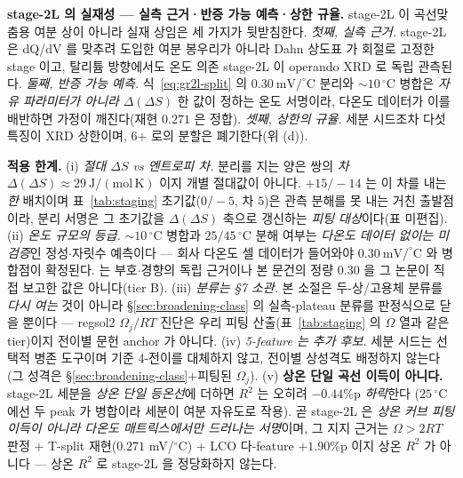 \medskip
\textbf{stage-2L 의 실재성 --- 실측 근거·반증 가능 예측·상한 규율.} stage-2L 이 곡선맞춤용 여분 상이 아니라 실재 상임은 세 가지가 뒷받침한다. \emph{첫째, 실측 근거.}
stage-2L 은 dQ/dV 를 맞추려 도입한 여분 봉우리가 아니라 Dahn 상도표\cite{dahn1991} 가 회절로 고정한 stage
이고, 탈리튬 방향에서도 온도 의존 stage-2L 이 operando XRD 로 독립 관측된다\cite{schmitt2022}. \emph{둘째,
반증 가능 예측.} 식~\eqref{eq:gr2l-split} 의 $0.30\ \mathrm{mV/^\circ C}$ 분리와 $\sim10\,^\circ$C 병합은
\emph{자유 파라미터가 아니라} $\Delta(\Delta S)$ 한 값이 정하는 온도 서명이라, 다온도 데이터가 이를 배반하면
가정이 깨진다(재현 $0.271$ 은 정합). \emph{셋째, 상한의 규율.} 세분 시드조차 다섯 특징이 XRD 상한이며, 6+ 로의
분할은 폐기한다(위 (d)).

\begin{warnbox}
\textbf{적용 한계.} (i) \emph{절대 $\Delta S$ vs 엔트로피 \emph{차}.} 분리를 지는 양은 쌍의 \emph{차}
$\Delta(\Delta S)\approx29\ \mathrm{J/(mol\,K)}$ 이지 개별 절대값이 아니다. $+15/-14$ 는 이 차를 내는 \emph{한}
배치이며 표~\ref{tab:staging} 초기값($0/-5$, 차 $5$)은 관측 분해를 못 내는 거친 출발점이라, 분리 서명은 그
초기값을 $\Delta(\Delta S)$ 축으로 갱신하는 \emph{피팅 대상}이다(표 미편집). (ii) \emph{온도 규모의 등급.}
$\sim10\,^\circ$C 병합과 $25/45\,^\circ$C 분해 여부는 \emph{다온도 데이터 없이는 미검증}인 정성$\cdot$자릿수
예측이다 --- 회사 다온도 셀 데이터가 들어와야 $0.30\ \mathrm{mV/^\circ C}$ 와 병합점이 확정된다.
\cite{schmitt2022} 는 부호$\cdot$경향의 독립 근거이나 본 문건의 정량 $0.30$ 을 그 논문이 직접 보고한 값은
아니다(tier B). (iii) \emph{분류는 §7 소관.} 본 소절은 두-상/고용체 분류를 \emph{다시 여는} 것이 아니라
\S\ref{sec:broadening-class} 의 실측-plateau 분류를 판정식으로 닫을 뿐이다 --- regsol2 $\Omega_j/RT$ 진단은 우리
피팅 산출(표~\ref{tab:staging} 의 $\Omega$ 열과 같은 tier)이지 전이별 문헌 anchor 가 아니다. (iv) \emph{5-feature
는 추가 후보.} 세분 시드는 선택적 병존 도구이며 기준 4-전이를 대체하지 않고, 전이별 상성격도 배정하지 않는다
(그 성격은 \S\ref{sec:broadening-class}$+$피팅된 $\Omega_j$). (v) \textbf{상온 단일 곡선
이득이 아니다.} stage-2L 세분을 \emph{상온 단일 등온선}에 더하면 $R^2$ 는 오히려 $-0.44\%$p \emph{하락}한다
($25\,^\circ$C 에선 두 peak 가 병합이라 세분이 여분 자유도로 작용). 곧 stage-2L 은 \emph{상온 커브 피팅 이득이
아니라 다온도 매트릭스에서만 드러나는 서명}이며, 그 지지 근거는 $\Omega>2RT$ 판정 $+$ T-split 재현($0.271$
mV/$^\circ$C) $+$ LCO 다-feature $+1.90\%$p 이지 상온 $R^2$ 가 아니다 --- 상온 $R^2$ 로 stage-2L 을 정당화하지 않는다.
\end{warnbox}

